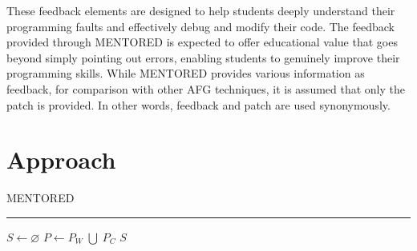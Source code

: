 \documentclass[10pt,conference]{IEEEtran}
\newcommand{\hrulealg}[0]{\vspace{1mm} \hrule \vspace{1mm}}
\begin{document}
        These feedback elements are designed to help students deeply understand their programming faults and effectively debug and modify their code. The feedback provided through MENTORED is expected to offer educational value that goes beyond simply pointing out errors, enabling students to genuinely improve their programming skills. While MENTORED provides various information as feedback, for comparison with other AFG techniques, it is assumed that only the patch is provided. In other words, feedback and patch are used synonymously.

    

\section{Approach}

    \begin{algorithm}[hbt!]
        \caption{MENTORED} \label{alg:MENTORED}
        \hrulealg
        $S \gets \varnothing$\;
        $P \gets P_{W}\;\bigcup\;P_{C}$ 
        \Return $S$
    \end{algorithm}
\end{document}
